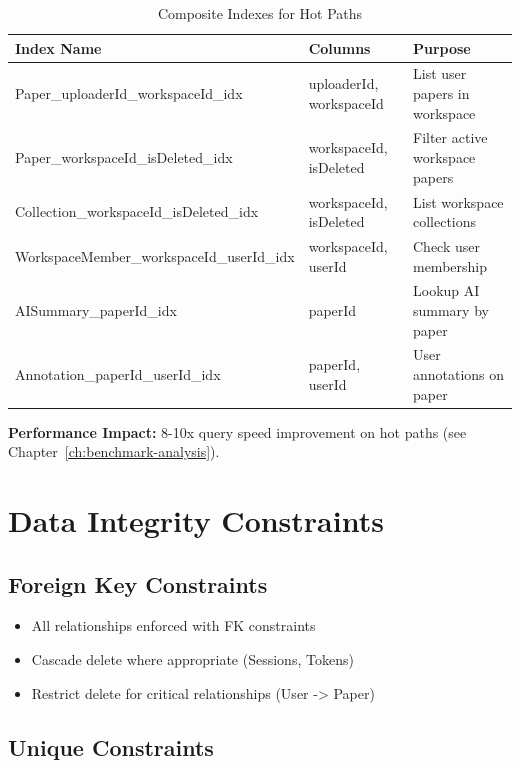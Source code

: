 \begin{table}[H]
\centering
\caption{Composite Indexes for Hot Paths}
\label{tab:erd-indexes}
\small
\begin{tabular}{@{}llp{5cm}@{}}
\toprule
\textbf{Index Name} & \textbf{Columns} & \textbf{Purpose} \\
\midrule
Paper\_uploaderId\_workspaceId\_idx & uploaderId, workspaceId & List user papers in workspace \\
Paper\_workspaceId\_isDeleted\_idx & workspaceId, isDeleted & Filter active workspace papers \\
Collection\_workspaceId\_isDeleted\_idx & workspaceId, isDeleted & List workspace collections \\
WorkspaceMember\_workspaceId\_userId\_idx & workspaceId, userId & Check user membership \\
AISummary\_paperId\_idx & paperId & Lookup AI summary by paper \\
Annotation\_paperId\_userId\_idx & paperId, userId & User annotations on paper \\
\bottomrule
\end{tabular}
\end{table}

\noindent
\textbf{Performance Impact:} 8-10x query speed improvement on hot paths (see Chapter~\ref{ch:benchmark-analysis}).

\section{Data Integrity Constraints}
\label{sec:erd-integrity}

\subsection{Foreign Key Constraints}

\begin{itemize}[leftmargin=*]
    \item All relationships enforced with FK constraints
    \item Cascade delete where appropriate (Sessions, Tokens)
  \item Restrict delete for critical relationships (User -> Paper)
\end{itemize}

\subsection{Unique Constraints}

